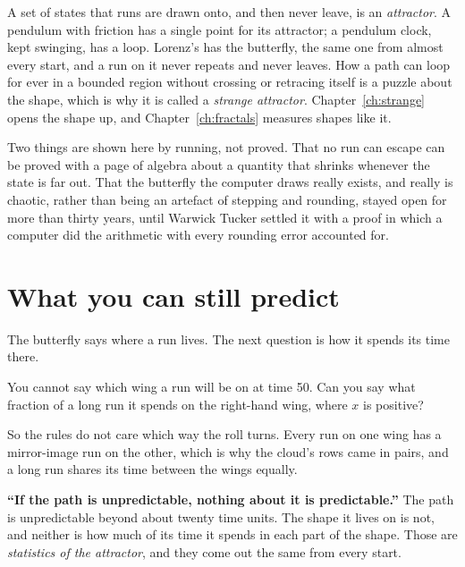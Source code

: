 \noindent
A set of states that runs are drawn onto, and then never leave, is an
\emph{attractor}. A pendulum with friction has a single point for its
attractor; a pendulum clock, kept swinging, has a loop. Lorenz's has the
butterfly, the same one from almost every start, and a run on it never
repeats and never leaves. How a path can loop for ever in a bounded region
without crossing or retracing itself is a puzzle about the shape, which is
why it is called a \emph{strange attractor}. Chapter~\ref{ch:strange} opens
the shape up, and Chapter~\ref{ch:fractals} measures shapes like it.

\begin{rigourbox}
Two things are shown here by running, not proved. That no run can escape
can be proved with a page of algebra about a quantity that shrinks whenever
the state is far out. That the butterfly the computer draws really exists,
and really is chaotic, rather than being an artefact of stepping and
rounding, stayed open for more than thirty years, until Warwick Tucker
settled it with a proof in which a computer did the arithmetic with every
rounding error accounted for.
\end{rigourbox}

\section{What you can still predict}
\label{sec:ch09-statistics}

\noindent
The butterfly says where a run lives. The next question is how it spends its
time there.

\begin{think}
You cannot say which wing a run will be on at time 50. Can you say what
fraction of a long run it spends on the right-hand wing, where $x$ is
positive?
\end{think}
So the rules do not care which way the roll turns. Every run on one wing has
a mirror-image run on the other, which is why the cloud's rows came in pairs,
and a long run shares its time between the wings equally.

\begin{trapbox}
\textbf{\enquote{If the path is unpredictable, nothing about it is
predictable.}} The path is unpredictable beyond about twenty time units. The
shape it lives on is not, and neither is how much of its time it spends in
each part of the shape. Those are \emph{statistics of the attractor}, and they
come out the same from every start.
\end{trapbox}


